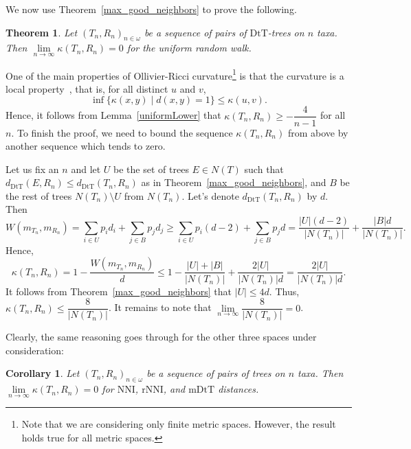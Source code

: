 \documentclass{amsart}
\newtheorem{corollary}[lemma]{Corollary}
\newtheorem{theorem}[lemma]{Theorem}
\newcommand{\dts}{\mathrm{DtT}}
\newcommand{\nni}{\mathrm{NNI}}
\newcommand{\rnni}{\mathrm{rNNI}}
\newcommand{\mdts}{\mathrm{mDtT}}
\begin{document}

We now use Theorem~\ref{max_good_neighbors} to prove the following.

\begin{theorem}\label{zero-in-the-limit}
Let $(T_n,R_n)_{n\in\omega}$ be a sequence of pairs of $\dts$-trees on $n$ taxa.
Then $\lim\limits_{n \to \infty}\kappa(T_n,R_n) = 0$ for the uniform random walk.
\end{theorem}

\proof
One of the main properties of Ollivier-Ricci curvature\footnote{Note that we are considering only finite metric spaces.
However, the result holds true for all metric spaces.}
is that the curvature is a local property~\cite{Ollivier2009-cj}, that is, for all distinct $u$ and $v$,
\[
\inf\{\kappa(x,y)\mid d(x,y) = 1\} \leq \kappa(u,v).
\]
Hence, it follows from Lemma~\ref{uniformLower} that $\kappa(T_n,R_n) \geq -\dfrac{4}{n-1}$ for all $n$.
To finish the proof, we need to bound the sequence $\kappa(T_n,R_n)$ from above by another sequence which tends to zero.

Let us fix an $n$ and let $U$ be the set of trees $E \in N(T)$ such that $d_\dts(E,R_n) \leq d_\dts(T_n,R_n)$ as in Theorem~\ref{max_good_neighbors}, and $B$ be the rest of trees $N(T_n)\setminus U$ from $N(T_n)$.
Let's denote $d_\dts(T_n,R_n)$ by $d$. Then
\[
W(m_{T_n},m_{R_n}) = \sum_{i\in U} p_i d_i + \sum_{j\in B} p_j d_j \geq
\sum_{i\in U} p_i (d-2) + \sum_{j\in B} p_j d =
\frac{|U|(d-2)}{|N(T_n)|} + \frac{|B|d}{|N(T_n)|}.
\]
Hence,
\[
\kappa(T_n,R_n) = 1 - \frac{W(m_{T_n},m_{R_n})}{d} \leq
1 - \frac{|U| + |B|}{|N(T_n)|} + \frac{2|U|}{|N(T_n)|d}
= \frac{2|U|}{|N(T_n)|d}.
\]
It follows from Theorem~\ref{max_good_neighbors} that $|U| \leq 4d$.
Thus, $\kappa(T_n,R_n) \leq \dfrac{8}{|N(T_n)|}$.
It remains to note that $\lim\limits_{n\to\infty}\dfrac{8}{|N(T_n)|} = 0$.
\endproof

Clearly, the same reasoning goes through for the other three spaces under consideration:

\begin{corollary}
Let $(T_n,R_n)_{n\in\omega}$ be a sequence of pairs of trees on $n$ taxa.
Then $\lim\limits_{n \to \infty}\kappa(T_n,R_n) = 0$ for $\nni$, $\rnni$, and $\mdts$ distances.
\end{corollary}
\end{document}
